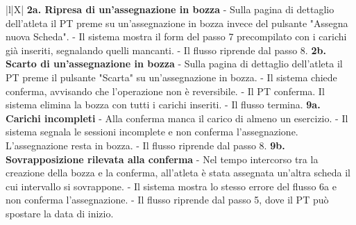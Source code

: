\documentclass[../../../../SoftwareRequirementsSpecification.tex]{subfiles}
\begin{document}
\begin{xltabular}{\textwidth}{|l|X|}
{    \newline
    \textbf{2a. Ripresa di un'assegnazione in bozza} \newline
    - Sulla pagina di dettaglio dell'atleta il PT preme su
    un'assegnazione in bozza invece del pulsante "Assegna nuova
    Scheda". \newline
    - Il sistema mostra il form del passo 7 precompilato con i
    carichi già inseriti, segnalando quelli mancanti. \newline
    - Il flusso riprende dal passo 8. \newline
    \newline
    \textbf{2b. Scarto di un'assegnazione in bozza} \newline
    - Sulla pagina di dettaglio dell'atleta il PT preme il pulsante
    "Scarta" su un'assegnazione in bozza. \newline
    - Il sistema chiede conferma, avvisando che l'operazione non è
    reversibile. \newline
    - Il PT conferma. Il sistema elimina la bozza con tutti i carichi
    inseriti. \newline
    - Il flusso termina. \newline
    \newline
    \textbf{9a. Carichi incompleti} \newline
    - Alla conferma manca il carico di almeno un esercizio. \newline
    - Il sistema segnala le sessioni incomplete e non conferma
    l'assegnazione. L'assegnazione resta in bozza. \newline
    - Il flusso riprende dal passo 8. \newline
    \newline
    \textbf{9b. Sovrapposizione rilevata alla conferma} \newline
    - Nel tempo intercorso tra la creazione della bozza e la
    conferma, all'atleta è stata assegnata un'altra scheda il cui
    intervallo si sovrappone. \newline
    - Il sistema mostra lo stesso errore del flusso 6a e non conferma
    l'assegnazione. \newline
    - Il flusso riprende dal passo 5, dove il PT può spostare la data
    di inizio. \newline
  } \\ \hline
\end{xltabular}
\end{document}
